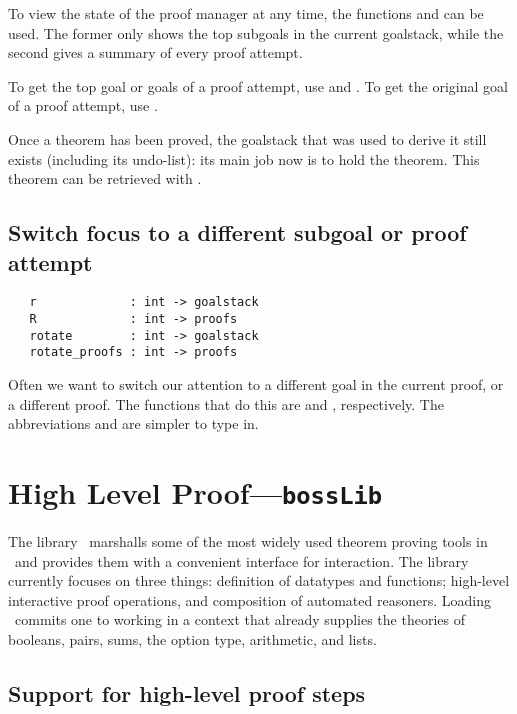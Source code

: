 To view the state of the proof manager at any time, the functions
 and  can be used. The former only shows
the top subgoals in the current goalstack, while the second gives a
summary of every proof attempt.

To get the top goal or goals of a proof attempt, use 
and . To get the original goal of a proof attempt,
use .

Once a theorem has been proved, the goalstack that was used to derive it
still exists (including its undo-list): its main job now is to
hold the theorem. This theorem can be retrieved with
.

\subsection{Switch focus to a different subgoal or proof attempt}

\begin{verbatim}
   r             : int -> goalstack
   R             : int -> proofs
   rotate        : int -> goalstack
   rotate_proofs : int -> proofs
\end{verbatim}

Often we want to switch our attention to a different goal in the current
proof, or a different proof. The functions that do this are
 and , respectively. The abbreviations
 and  are simpler to type in.

\section{High Level Proof---\texttt{bossLib}}
\label{sec:bossLib}
\newcommand\bossLib{\ml{bossLib}}

The library \bossLib\ marshalls some of the most widely used theorem
proving tools in \HOL\ and provides them with a convenient interface
for interaction. The library currently focuses on three things:
definition of datatypes and functions; high-level interactive proof
operations, and composition of automated reasoners. Loading \bossLib\
commits one to working in a context that already supplies the theories
of booleans, pairs, sums, the option type, arithmetic, and lists.


\subsection{Support for high-level proof steps}
\label{sec:high-level-proof-steps}

